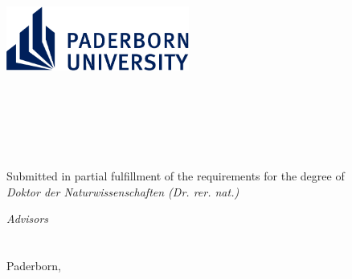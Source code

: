 %


\begin{titlepage}
	\tgherosfont
	\centering

	\includegraphics[width=6cm]{gfx/UPB-Logo.pdf} \\[2mm]
	\textsf{\thesisUniversityDepartment} \\
	\textsf{\thesisUniversityInstitute} \\
	\textsf{\thesisUniversityGroup} \\

	\vfill
	{\LARGE \color{ctcolortitle}\textbf{\thesisTitle} \\[10mm]}
	{\Large \thesisName} \\

	\vfill
	{
	\centering
		\thesisSubject \\[2mm]
		Submitted in partial fulfillment of the requirements for the degree of \\[2mm]
		\textit{Doktor der Naturwissenschaften (Dr. rer. nat.)}
	}
	\vfill
	{\centering

		\textit{Advisors}\\[2mm]
		\thesisFirstSupervisor\ \\ \thesisSecondSupervisor\\[12mm]


		Paderborn, \thesisDate \\
	}


\end{titlepage}
